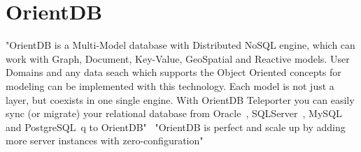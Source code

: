 \section{OrientDB}

"OrientDB is a Multi-Model database with Distributed NoSQL engine, which can work with Graph, 
Document, Key-Value, GeoSpatial and Reactive models. User Domains and any data seach which supports
the Object Oriented concepts for modeling can be implemented with this technology. Each model is 
not just a layer, but coexists in one single engine. With OrientDB Teleporter you can easily sync 
(or migrate) your relational database from Oracle~\cite{??}, SQLServer~\cite{??}, 
MySQL~\cite{??} and PostgreSQL~\cite{??}q to OrientDB"~\cite{hid-sp18-520-OrientDB}
"OrientDB is perfect and scale up by adding 
more server instances with 
zero-configuration"~\cite{hid-sp18-520-OrientDB-cloud}
